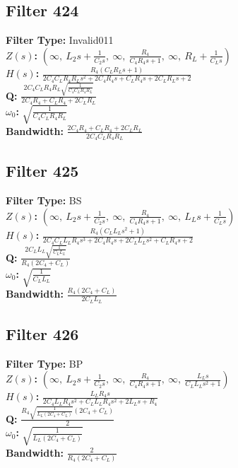 \documentclass{article}
\begin{document}
\subsection*{Filter 424}
\textbf{Filter Type:} Invalid011 \\ 
\textbf{$Z(s)$:} $\left( \infty, \  L_{2} s + \frac{1}{C_{2} s}, \  \infty, \  \frac{R_{4}}{C_{4} R_{4} s + 1}, \  \infty, \  R_{L} + \frac{1}{C_{L} s}\right)$ \\ 
\textbf{$H(s)$:} $\frac{R_{4} \left(C_{L} R_{L} s + 1\right)}{2 C_{4} C_{L} R_{4} R_{L} s^{2} + 2 C_{4} R_{4} s + C_{L} R_{4} s + 2 C_{L} R_{L} s + 2}$ \\ 
\textbf{Q:} $\frac{2 C_{4} C_{L} R_{4} R_{L} \sqrt{\frac{1}{C_{4} C_{L} R_{4} R_{L}}}}{2 C_{4} R_{4} + C_{L} R_{4} + 2 C_{L} R_{L}}$ \\ 
\textbf{$\omega_0$:} $\sqrt{\frac{1}{C_{4} C_{L} R_{4} R_{L}}}$ \\ 
\textbf{Bandwidth:} $\frac{2 C_{4} R_{4} + C_{L} R_{4} + 2 C_{L} R_{L}}{2 C_{4} C_{L} R_{4} R_{L}}$ \\ 
\subsection*{Filter 425}
\textbf{Filter Type:} BS \\ 
\textbf{$Z(s)$:} $\left( \infty, \  L_{2} s + \frac{1}{C_{2} s}, \  \infty, \  \frac{R_{4}}{C_{4} R_{4} s + 1}, \  \infty, \  L_{L} s + \frac{1}{C_{L} s}\right)$ \\ 
\textbf{$H(s)$:} $\frac{R_{4} \left(C_{L} L_{L} s^{2} + 1\right)}{2 C_{4} C_{L} L_{L} R_{4} s^{3} + 2 C_{4} R_{4} s + 2 C_{L} L_{L} s^{2} + C_{L} R_{4} s + 2}$ \\ 
\textbf{Q:} $\frac{2 C_{L} L_{L} \sqrt{\frac{1}{C_{L} L_{L}}}}{R_{4} \left(2 C_{4} + C_{L}\right)}$ \\ 
\textbf{$\omega_0$:} $\sqrt{\frac{1}{C_{L} L_{L}}}$ \\ 
\textbf{Bandwidth:} $\frac{R_{4} \left(2 C_{4} + C_{L}\right)}{2 C_{L} L_{L}}$ \\ 
\subsection*{Filter 426}
\textbf{Filter Type:} BP \\ 
\textbf{$Z(s)$:} $\left( \infty, \  L_{2} s + \frac{1}{C_{2} s}, \  \infty, \  \frac{R_{4}}{C_{4} R_{4} s + 1}, \  \infty, \  \frac{L_{L} s}{C_{L} L_{L} s^{2} + 1}\right)$ \\ 
\textbf{$H(s)$:} $\frac{L_{L} R_{4} s}{2 C_{4} L_{L} R_{4} s^{2} + C_{L} L_{L} R_{4} s^{2} + 2 L_{L} s + R_{4}}$ \\ 
\textbf{Q:} $\frac{R_{4} \sqrt{\frac{1}{L_{L} \left(2 C_{4} + C_{L}\right)}} \left(2 C_{4} + C_{L}\right)}{2}$ \\ 
\textbf{$\omega_0$:} $\sqrt{\frac{1}{L_{L} \left(2 C_{4} + C_{L}\right)}}$ \\ 
\textbf{Bandwidth:} $\frac{2}{R_{4} \left(2 C_{4} + C_{L}\right)}$ \\ 
\end{document}
